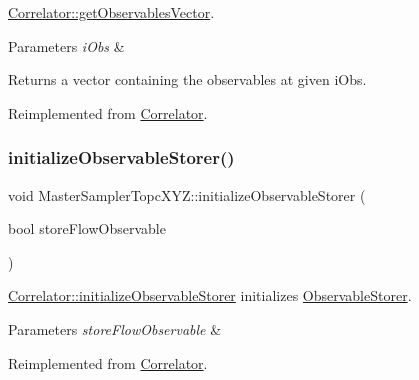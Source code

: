 \mbox{\hyperlink{class_correlator_a7fb062b098beb078f3e546f4717b4941}{Correlator\+::get\+Observables\+Vector}}. 


\begin{DoxyParams}{Parameters}
{\em i\+Obs} & \\
\hline
\end{DoxyParams}
\begin{DoxyReturn}{Returns}
a vector containing the observables at given i\+Obs. 
\end{DoxyReturn}


Reimplemented from \mbox{\hyperlink{class_correlator_a7fb062b098beb078f3e546f4717b4941}{Correlator}}.

\mbox{\label{class_master_sampler_topc_x_y_z_af6d2cf2023d9626908fd26b07a7a0b84}} 
\subsubsection{\texorpdfstring{initializeObservableStorer()}{initializeObservableStorer()}}
{\footnotesize\ttfamily void Master\+Sampler\+Topc\+X\+Y\+Z\+::initialize\+Observable\+Storer (\begin{DoxyParamCaption}\item[{bool}]{store\+Flow\+Observable }\end{DoxyParamCaption})\hspace{0.3cm}{\ttfamily [virtual]}}



\mbox{\hyperlink{class_correlator_ab99886c09dd27dfc8676d0032cecf9bc}{Correlator\+::initialize\+Observable\+Storer}} initializes \mbox{\hyperlink{class_observable_storer}{Observable\+Storer}}. 


\begin{DoxyParams}{Parameters}
{\em store\+Flow\+Observable} & \\
\hline
\end{DoxyParams}


Reimplemented from \mbox{\hyperlink{class_correlator_ab99886c09dd27dfc8676d0032cecf9bc}{Correlator}}.

